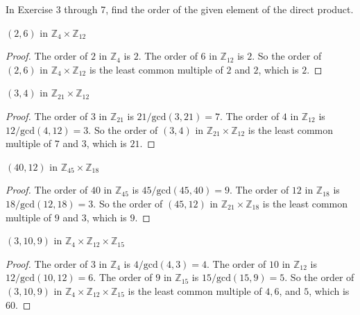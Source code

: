 In Exercise 3 through 7, find the order of the given element of the direct product.

\begin{exercise}
    $(2,6)$ in $\mathbb{Z}_{4}\times\mathbb{Z}_{12}$
\end{exercise}

\begin{proof}
    The order of $2$ in $\mathbb{Z}_{4}$ is $2$. The order of $6$ in $\mathbb{Z}_{12}$ is $2$. So the order of $(2,6)$ in $\mathbb{Z}_{4}\times\mathbb{Z}_{12}$ is the least common multiple of $2$ and $2$, which is $2$.
\end{proof}

\begin{exercise}
    $(3,4)$ in $\mathbb{Z}_{21}\times\mathbb{Z}_{12}$
\end{exercise}

\begin{proof}
    The order of $3$ in $\mathbb{Z}_{21}$ is $21/\text{gcd}(3,21) = 7$. The order of $4$ in $\mathbb{Z}_{12}$ is $12/\text{gcd}(4,12) = 3$. So the order of $(3,4)$ in $\mathbb{Z}_{21}\times\mathbb{Z}_{12}$ is the least common multiple of $7$ and $3$, which is $21$.
\end{proof}

\begin{exercise}
    $(40,12)$ in $\mathbb{Z}_{45}\times\mathbb{Z}_{18}$
\end{exercise}

\begin{proof}
    The order of $40$ in $\mathbb{Z}_{45}$ is $45/\text{gcd}(45,40) = 9$. The order of $12$ in $\mathbb{Z}_{18}$ is $18/\text{gcd}(12,18) = 3$. So the order of $(45,12)$ in $\mathbb{Z}_{21}\times\mathbb{Z}_{18}$ is the least common multiple of $9$ and $3$, which is $9$.
\end{proof}

\begin{exercise}
    $(3,10,9)$ in $\mathbb{Z}_{4}\times\mathbb{Z}_{12}\times\mathbb{Z}_{15}$
\end{exercise}

\begin{proof}
    The order of $3$ in $\mathbb{Z}_{4}$ is $4/\text{gcd}(4,3) = 4$. The order of $10$ in $\mathbb{Z}_{12}$ is $12/\text{gcd}(10,12) = 6$. The order of $9$ in $\mathbb{Z}_{15}$ is $15/\text{gcd}(15,9) = 5$. So the order of $(3,10,9)$ in $\mathbb{Z}_{4}\times\mathbb{Z}_{12}\times\mathbb{Z}_{15}$ is the least common multiple of $4, 6$, and $5$, which is $60$.
\end{proof}

